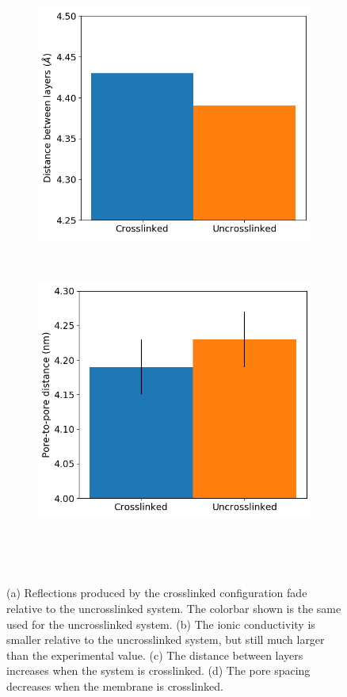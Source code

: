 \documentclass{article}
\begin{document}
\begin{figure}
\begin{subfigure}{0.45\textwidth}
	\includegraphics[width=\textwidth]{dbwl_xlink.png}
	\caption{}~\label{fig:dbwl_xlink}
  \end{subfigure}
  \begin{subfigure}{0.45\textwidth}
	\centering
	\includegraphics[width=\textwidth]{p2p_xlink.png}
	\caption{}~\label{fig:p2p_xlink}
  \end{subfigure}
  \caption{(a) Reflections produced by the crosslinked configuration fade
	  relative to the uncrosslinked system. The colorbar shown is the same used for
	  the uncrosslinked system. (b) The ionic conductivity is smaller relative to the
	  uncrosslinked system, but still much larger than the experimental value. (c)
	  The distance between layers increases when the system is crosslinked. (d) The
	  pore spacing decreases when the membrane is crosslinked.}~\label{fig:xlink}
  \end{figure}
 
\end{document}
